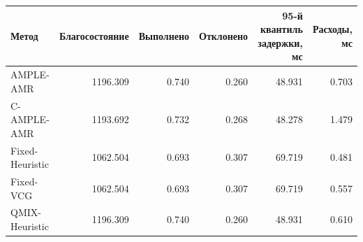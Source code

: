 \begin{tabular}{lrrrrr}
\toprule
 Метод & Благосостояние & Выполнено & Отклонено & 95-й квантиль задержки, мс & Расходы, мс \\
\midrule
 AMPLE-AMR & 1196.309 & 0.740 & 0.260 & 48.931 & 0.703 \\
 C-AMPLE-AMR & 1193.692 & 0.732 & 0.268 & 48.278 & 1.479 \\
 Fixed-Heuristic & 1062.504 & 0.693 & 0.307 & 69.719 & 0.481 \\
 Fixed-VCG & 1062.504 & 0.693 & 0.307 & 69.719 & 0.557 \\
 QMIX-Heuristic & 1196.309 & 0.740 & 0.260 & 48.931 & 0.610 \\
\bottomrule
\end{tabular}
